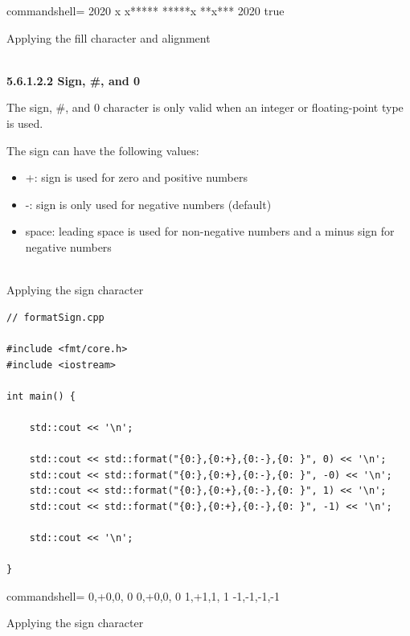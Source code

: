 \begin{tcblisting}{commandshell={}}
  2020
x
x*****
*****x
**x***
  2020
true
\end{tcblisting}

\begin{center}
Applying the fill character and alignment
\end{center}

\hspace*{\fill} \\ %
\noindent
\textbf{5.6.1.2.2\hspace{0.2cm} Sign, \#, and 0}

The sign, \#, and 0 character is only valid when an integer or floating-point type is used.

The sign can have the following values:

\begin{itemize}
\item 
+: sign is used for zero and positive numbers

\item 
-: sign is only used for negative numbers (default)

\item 
space: leading space is used for non-negative numbers and a minus sign for negative numbers
\end{itemize}

\hspace*{\fill} \\ %
\noindent
Applying the sign character
\begin{lstlisting}[style=styleCXX]
// formatSign.cpp

#include <fmt/core.h>
#include <iostream>

int main() {
	
	std::cout << '\n';
	
	std::cout << std::format("{0:},{0:+},{0:-},{0: }", 0) << '\n';
	std::cout << std::format("{0:},{0:+},{0:-},{0: }", -0) << '\n';
	std::cout << std::format("{0:},{0:+},{0:-},{0: }", 1) << '\n';
	std::cout << std::format("{0:},{0:+},{0:-},{0: }", -1) << '\n';
	
	std::cout << '\n';
	
}
\end{lstlisting}

\begin{tcblisting}{commandshell={}}
0,+0,0, 0
0,+0,0, 0
1,+1,1, 1
-1,-1,-1,-1
\end{tcblisting}

\begin{center}
Applying the sign character
\end{center}

